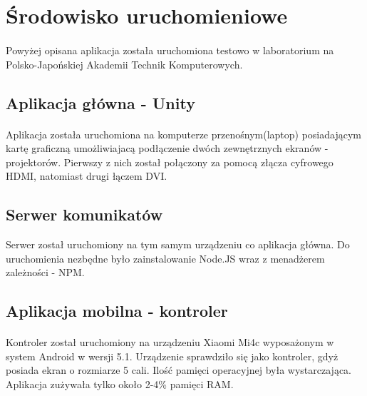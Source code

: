 \section{Środowisko uruchomieniowe}
\paragraph{}
Powyżej opisana aplikacja została uruchomiona testowo w laboratorium na Polsko-Japońskiej Akademii Technik Komputerowych.

\subsection{Aplikacja główna - Unity}
\paragraph{}
Aplikacja została uruchomiona na komputerze przenośnym(laptop) posiadającym kartę graficzną umożliwiajacą podłączenie dwóch zewnętrznych ekranów - projektorów. Pierwszy z nich został połączony za pomocą złącza cyfrowego HDMI, natomiast drugi łączem DVI.
\subsection{Serwer komunikatów}
Serwer został uruchomiony na tym samym urządzeniu co aplikacja główna. Do uruchomienia nezbędne było zainstalowanie Node.JS wraz z menadżerem zależności - NPM.
\subsection{Aplikacja mobilna - kontroler}
\paragraph{}
Kontroler został uruchomiony na urządzeniu Xiaomi Mi4c wyposażonym w system Android w wersji 5.1. Urządzenie sprawdziło się jako kontroler, gdyż posiada ekran o rozmiarze 5 cali. Ilość pamięci operacyjnej była wystarczająca. Aplikacja zużywała tylko około 2-4\% pamięci RAM. 